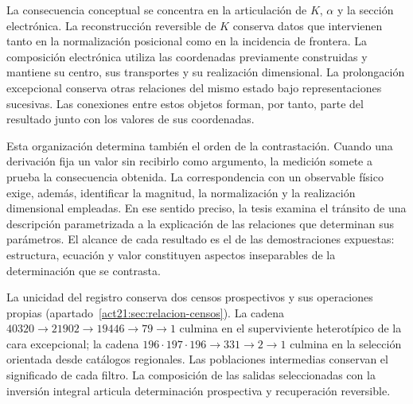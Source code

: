 La consecuencia conceptual se concentra en la articulación de \(K\),
\(\alpha\) y la sección electrónica. La reconstrucción reversible de
\(K\) conserva datos que intervienen tanto en la normalización posicional
como en la incidencia de frontera. La composición electrónica utiliza las
coordenadas previamente construidas y mantiene su centro, sus transportes
y su realización dimensional. La prolongación excepcional conserva otras
relaciones del mismo estado bajo representaciones sucesivas. Las conexiones
entre estos objetos forman, por tanto, parte del resultado junto con los
valores de sus coordenadas.

Esta organización determina también el orden de la contrastación. Cuando
una derivación fija un valor sin recibirlo como argumento, la medición
somete a prueba la consecuencia obtenida. La correspondencia con un
observable físico exige, además, identificar la magnitud, la normalización
y la realización dimensional empleadas. En ese sentido preciso, la tesis
examina el tránsito de una descripción parametrizada a la explicación de
las relaciones que determinan sus parámetros. El alcance de cada resultado
es el de las demostraciones expuestas: estructura, ecuación y valor
constituyen aspectos inseparables de la determinación que se contrasta.

La unicidad del registro conserva dos censos prospectivos y sus
operaciones propias (apartado~\ref{act21:sec:relacion-censos}).
La cadena \(40320\to21902\to19446\to79\to1\) culmina en el
superviviente heterotípico de la cara excepcional; la cadena
\(196\cdot197\cdot196\to331\to2\to1\) culmina en la selección
orientada desde catálogos regionales. Las poblaciones intermedias
conservan el significado de cada filtro. La composición de las salidas
seleccionadas con la inversión integral articula determinación
prospectiva y recuperación reversible.
